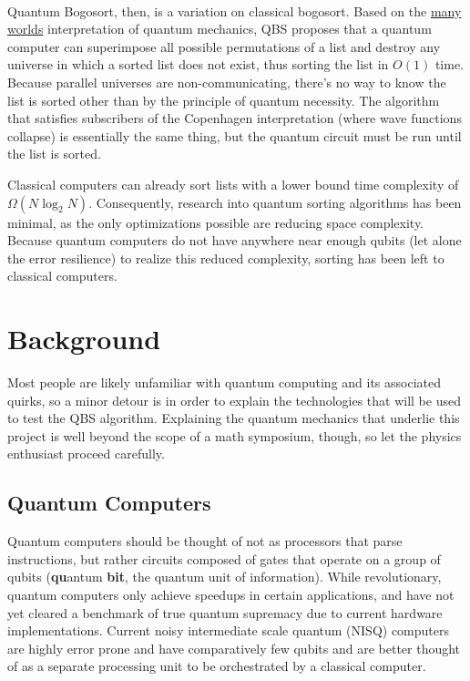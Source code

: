 \documentclass[12pt]{article}
\begin{document}
Quantum Bogosort\textsuperscript{\cite{ryder_2018}}, then, is a variation on classical bogosort. Based on the \href{https://www.pbs.org/wgbh/nova/manyworlds/pdf/dissertation.pdf}{many worlds} interpretation of quantum mechanics, QBS proposes that a quantum computer can superimpose all possible permutations of a list and destroy any universe in which a sorted list does not exist, thus sorting the list in $ O(1) $ time. Because parallel universes are non-communicating, there's no way to know the list is sorted other than by the principle of quantum necessity. The algorithm that satisfies subscribers of the Copenhagen interpretation (where wave functions collapse) is essentially the same thing, but the quantum circuit must be run until the list is sorted.

Classical computers can already sort lists with a lower bound time complexity of $\Omega (N \log_2 N)$. Consequently, research into quantum sorting algorithms has been minimal, as the only optimizations possible are reducing space complexity. Because quantum computers do not have anywhere near enough qubits (let alone the error resilience) to realize this reduced complexity, sorting has been left to classical computers.

\section{Background}
Most people are likely unfamiliar with quantum computing and its associated quirks, so a minor detour is in order to explain the technologies that will be used to test the QBS algorithm. Explaining the quantum mechanics that underlie this project is well beyond the scope of a math symposium, though, so let the physics enthusiast proceed carefully.

\subsection{Quantum Computers}
Quantum computers should be thought of not as processors that parse instructions, but rather circuits composed of gates that operate on a group of qubits (\textbf{qu}antum \textbf{bit}, the quantum unit of information). While revolutionary, quantum computers only achieve speedups in certain applications, and have not yet cleared a benchmark of true quantum supremacy due to current hardware implementations. Current noisy intermediate scale quantum (NISQ) computers are highly error prone and have comparatively few qubits and are better thought of as a separate processing unit to be orchestrated by a classical computer.
\end{document}
